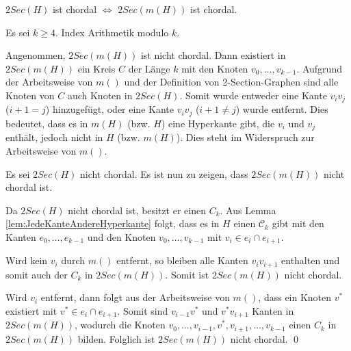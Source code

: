 \begin{Theorem}\label{theo:ChordalM}
$2Sec(H)$ ist chordal $\Leftrightarrow$ $2Sec(m(H))$ ist chordal.
\end{Theorem}


\begin{Proof} Es sei $k\geq4$. Index Arithmetik modulo $k$.

\prR Angenommen, $2Sec(m(H))$ ist nicht chordal. Dann existiert in $2Sec(m(H))$ ein Kreis $C$ der Länge $k$ mit den Knoten $v_0,\ldots,v_{k-1}$. 
Aufgrund der Arbeitsweise von $m()$ und der Definition von 2-Section-Graphen sind alle Knoten von $C$ auch Knoten in $2Sec(H)$. Somit wurde entweder eine Kante $v_iv_j$ ($i+1=j$) hinzugefügt, oder eine Kante $v_iv_j$ ($i+1\neq j$) wurde entfernt.
Dies bedeutet, dass es in $m(H)$ (bzw. $H$) eine Hyperkante gibt, die $v_i$ und $v_j$ enthält, jedoch nicht in $H$ (bzw. $m(H)$). Dies steht im Widerspruch zur Arbeitsweise von $m()$.

\prL Es sei $2Sec(H)$ nicht chordal. Es ist nun zu zeigen, dass $2Sec(m(H))$ nicht chordal ist.

Da $2Sec(H)$ nicht chordal ist, besitzt er einen $C_k$. Aus Lemma \ref{lem:JedeKanteAndereHyperkante} folgt, dass es in $H$ einen $\mathcal{C}_k$  gibt mit den Kanten $e_0,\ldots,e_{k-1}$ und den Knoten $v_0,\ldots,v_{k-1}$ mit $v_i \in e_i\cap e_{i+1}$.

Wird kein $v_i$ durch $m()$ entfernt, so bleiben alle Kanten $v_iv_{i+1}$ enthalten und somit auch der $C_k$ in $2Sec(m(H))$. Somit ist $2Sec(m(H))$ nicht chordal.

Wird $v_i$ entfernt, dann folgt aus der Arbeitsweise von $m()$, dass ein Knoten $v^*$ existiert mit $v^* \in e_i\cap e_{i+1}$. 
Somit sind $v_{i-1}v^*$ und $v^*v_{i+1}$ Kanten in $2Sec(m(H))$, wodurch die Knoten $v_0,\ldots,v_{i-1},v^*,v_{i+1},\ldots,v_{k-1}$ einen $C_k$ in $2Sec(m(H))$ bilden. Folglich ist $2Sec(m(H))$ nicht chordal. \qed
\end{Proof}

